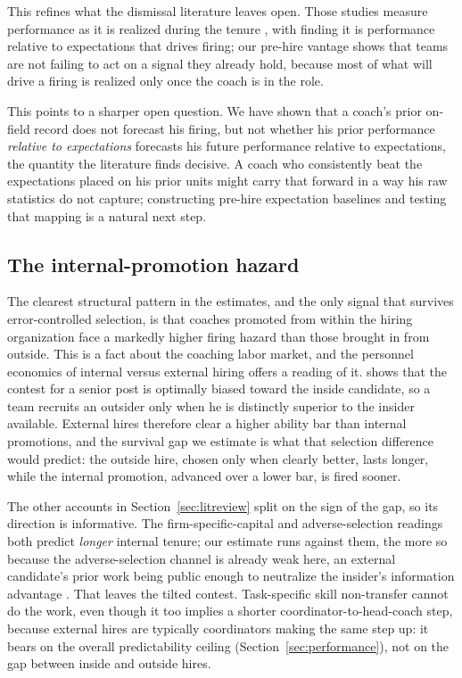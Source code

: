 \documentclass[12pt,USenglish]{article}
\begin{document}
This refines what the dismissal literature leaves open. Those studies measure performance as it is realized during the tenure \citep{allen2012, salaga2020, foreman2019}, with \citet{allen2012} finding it is performance relative to expectations that drives firing; our pre-hire vantage shows that teams are not failing to act on a signal they already hold, because most of what will drive a firing is realized only once the coach is in the role.

This points to a sharper open question. We have shown that a coach's prior on-field record does not forecast his firing, but not whether his prior performance \emph{relative to expectations} forecasts his future performance relative to expectations, the quantity the literature finds decisive. A coach who consistently beat the expectations placed on his prior units might carry that forward in a way his raw statistics do not capture; constructing pre-hire expectation baselines and testing that mapping is a natural next step.

\subsection{The internal-promotion hazard}

The clearest structural pattern in the estimates, and the only signal that survives error-controlled selection, is that coaches promoted from within the hiring organization face a markedly higher firing hazard than those brought in from outside. This is a fact about the coaching labor market, and the personnel economics of internal versus external hiring offers a reading of it. \citet{chan1996} shows that the contest for a senior post is optimally biased toward the inside candidate, so a team recruits an outsider only when he is distinctly superior to the insider available. External hires therefore clear a higher ability bar than internal promotions, and the survival gap we estimate is what that selection difference would predict: the outside hire, chosen only when clearly better, lasts longer, while the internal promotion, advanced over a lower bar, is fired sooner.

The other accounts in Section~\ref{sec:litreview} split on the sign of the gap, so its direction is informative. The firm-specific-capital and adverse-selection readings both predict \emph{longer} internal tenure; our estimate runs against them, the more so because the adverse-selection channel is already weak here, an external candidate's prior work being public enough to neutralize the insider's information advantage \citep{greenwald1986}. That leaves the tilted contest. Task-specific skill non-transfer cannot do the work, even though it too implies a shorter coordinator-to-head-coach step, because external hires are typically coordinators making the same step up: it bears on the overall predictability ceiling (Section~\ref{sec:performance}), not on the gap between inside and outside hires.
\end{document}
